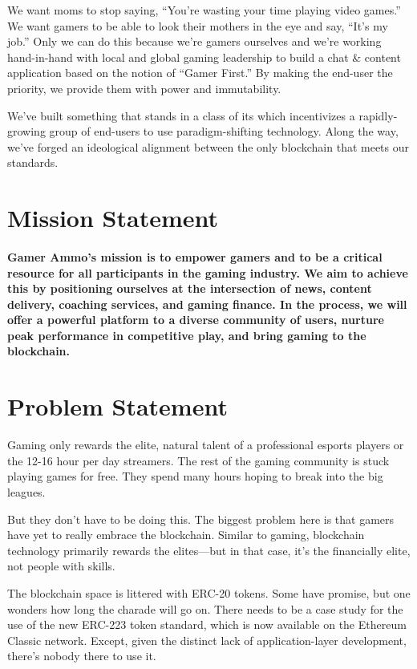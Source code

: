 \documentclass[11pt]{report}
\begin{document}
We want moms to stop saying, ``You're wasting your time playing video games.'' We want gamers to be able to look their mothers in the eye and say, “It’s my job.” Only we can do this because we're gamers ourselves and we're working hand-in-hand with local and global gaming leadership to build a chat \& content application based on the notion of ``Gamer First.'' By making the end-user the priority, we provide them with power and immutability.

We've built something that stands in a class of its which incentivizes a rapidly-growing group of end-users to use paradigm-shifting technology. Along the way, we've forged an ideological alignment between the only blockchain that meets our standards.
\section{Mission Statement}
\paragraph{Gamer Ammo's mission is to empower gamers and to be a critical resource for all participants in the gaming industry. We aim to achieve this by positioning ourselves at the intersection of news, content delivery, coaching services, and gaming finance. In the process, we will offer a powerful platform to a diverse community of users, nurture peak performance in competitive play, and bring gaming to the blockchain.}
\section{Problem Statement}
Gaming only rewards the elite, natural talent of a professional esports players or the 12-16 hour per day streamers. The rest of the gaming community is stuck playing games for free. They spend many hours hoping to break into the big leagues.

But they don't have to be doing this. The biggest problem here is that gamers have yet to really embrace the blockchain. Similar to gaming, blockchain technology primarily rewards the elites---but in that case, it's the financially elite, not people with skills.

The blockchain space is littered with ERC-20 tokens. Some have promise, but one wonders how long the charade will go on. There needs to be a case study for the use of the new ERC-223 token standard, which is now available on the Ethereum Classic network. Except, given the distinct lack of application-layer development, there's nobody there to use it.
\end{document}
